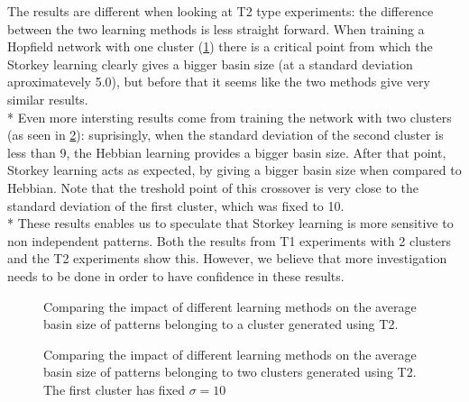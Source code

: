 
The results are different when looking at T2 type experiments:
the difference between the two learning methods is less straight forward.
When training a Hopfield network with one cluster (\ref{fig:plot-storkey-T2-onecluster})  there is a critical point from which the Storkey learning clearly gives a bigger basin size 
(at a standard deviation aproximatevely 5.0), but before that it seems like the two methods give very similar results.
\\*
Even more intersting results come from training the network with two clusters (as seen in \ref{fig:plot-storkey-T2-twoclusters}): suprisingly, when the standard deviation of the second cluster 
is less than 9, the Hebbian learning provides a bigger basin size. After that point, Storkey learning acts as expected, by giving a 
bigger basin size when compared to Hebbian. Note that the treshold point of this crossover is very close to the standard deviation of the first
cluster, which was fixed to 10. 
\\* These results enables us to speculate that Storkey learning is more sensitive to non independent patterns. Both the results from T1 experiments with
2 clusters and the T2 experiments show this. However, we believe that more investigation needs to be done in order to have confidence in these results.


\begin{figure}[h!]
  \centering
  
\caption{Comparing the impact of different learning methods on the average basin size of patterns belonging to a cluster generated using T2.}
\label{fig:plot-storkey-T2-onecluster}
\end{figure}

\begin{figure}[h]
  \centering
  
\caption{Comparing the impact of different learning methods on the average basin size of patterns belonging to two clusters generated using T2. The first cluster has fixed $\sigma = 10$}
\label{fig:plot-storkey-T2-twoclusters}
\end{figure}
